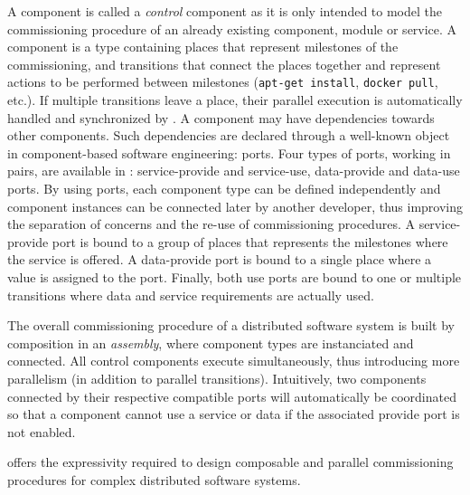 A \mad component is called a \emph{control} component as it is only
intended to model the commissioning procedure of an already existing
component, module or service. A \mad component is a type containing
places that represent milestones of the commissioning, and transitions
that connect the places together and represent actions to be performed
between milestones (\eg \texttt{apt-get install}, \texttt{docker pull},
etc.). If multiple transitions leave a place, their parallel execution
is automatically handled and synchronized by \mad. A component may
have dependencies towards other components. Such dependencies are declared
through a well-known object in component-based software engineering:
ports. Four types of ports, working in pairs, are available in \mad:
service-provide and service-use, data-provide and data-use ports. By
using ports, each component type can be defined independently and
component instances can be connected later by another developer, thus
improving the separation of concerns and the re-use of commissioning
procedures. A service-provide port is bound to a group of places that
represents the milestones where the service is offered. A data-provide
port is bound to a single place where a value is assigned to the
port. Finally, both use ports are bound to one or multiple transitions
where data and service requirements are actually used.

The overall commissioning procedure of a distributed software system
is built by composition in an \emph{assembly}, where component
types are instanciated and connected. All control components execute
simultaneously, thus introducing more parallelism (in addition to
parallel transitions). Intuitively, two components connected by their
respective compatible ports will automatically be coordinated so
that a component cannot use a service or data if the associated
provide port is not enabled.

\mad offers the expressivity required to design composable and parallel
commissioning procedures for complex distributed software systems.

